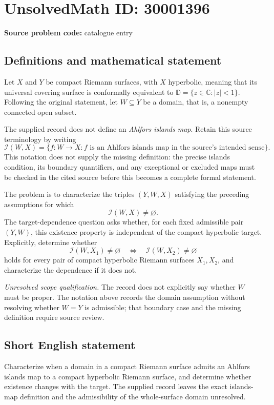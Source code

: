 \documentclass[11pt]{article}
\newcommand{\C}{\mathbb{C}}
\begin{document}
\section*{UnsolvedMath ID: 30001396}
\textbf{Source problem code:} catalogue entry
\subsection{Definitions and mathematical statement}
Let \(X\) and \(Y\) be compact Riemann surfaces, with \(X\) hyperbolic, meaning that its universal covering surface is conformally equivalent to \(\mathbb D=\{z\in\C:|z|<1\}\). Following the original statement, let \(W\subseteq Y\) be a domain, that is, a nonempty connected open subset.

The supplied record does not define an \emph{Ahlfors islands map}. Retain this source terminology by writing
\[
\mathcal I(W,X)=\{f:W\to X : f\text{ is an Ahlfors islands map in the source's intended sense}\}.
\]
This notation does not supply the missing definition: the precise islands condition, its boundary quantifiers, and any exceptional or excluded maps must be checked in the cited source before this becomes a complete formal statement.

The problem is to characterize the triples \((Y,W,X)\) satisfying the preceding assumptions for which
\[
\mathcal I(W,X)\ne\varnothing.
\]
The target-dependence question asks whether, for each fixed admissible pair \((Y,W)\), this existence property is independent of the compact hyperbolic target. Explicitly, determine whether
\[
\mathcal I(W,X_1)\ne\varnothing
\quad\Longleftrightarrow\quad
\mathcal I(W,X_2)\ne\varnothing
\]
holds for every pair of compact hyperbolic Riemann surfaces \(X_1,X_2\), and characterize the dependence if it does not.

\emph{Unresolved scope qualification.} The record does not explicitly say whether \(W\) must be proper. The notation above records the domain assumption without resolving whether \(W=Y\) is admissible; that boundary case and the missing definition require source review.
\subsection{Short English statement}
Characterize when a domain in a compact Riemann surface admits an Ahlfors islands map to a compact hyperbolic Riemann surface, and determine whether existence changes with the target. The supplied record leaves the exact islands-map definition and the admissibility of the whole-surface domain unresolved.
\end{document}
